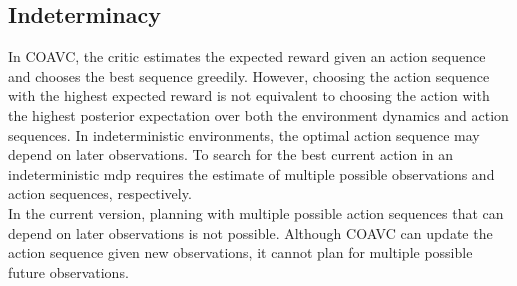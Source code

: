   

\subsection{Indeterminacy}
In COAVC, the critic estimates the expected reward given an action sequence and chooses the best sequence greedily. 
However, choosing the action sequence with the highest expected reward is not equivalent to choosing the action with the highest posterior 
expectation over both the environment dynamics and action sequences. In indeterministic environments, the optimal action sequence may depend on later observations. To 
search for the best current action in an indeterministic \ac{mdp} requires the estimate of multiple possible observations and action sequences, respectively. \\

In the current version, planning with multiple possible action sequences that can depend on later observations is not possible. 
Although COAVC can update the action sequence given new observations, it cannot plan for multiple possible future observations.